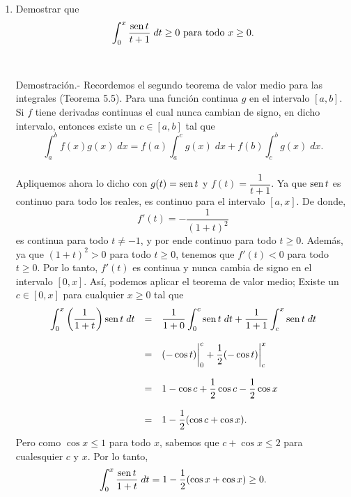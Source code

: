 \begin{enumerate}[\bfseries 1.]
    \item Demostrar que
    $$\int_0^x \dfrac{\mathop{\mbox{\normalfont sen}}\nolimits t}{t+1}\; dt \geq 0\mbox{ para todo }x\geq 0.$$\\\\
	Demostración.-\; Recordemos el segundo teorema de valor medio para las integrales (Teorema 5.5). Para una función continua $g$ en el intervalo $[a,b]$. Si $f$ tiene derivadas continuas el cual nunca cambian de signo, en dicho intervalo, entonces existe un $c\in[a,b]$ tal que
	$$\int_a^b f(x)g(x)\;dx =f(a)\int_a^c g(x)\; dx + f(b)\int_c^b g(x)\; dx.$$\\
	Apliquemos ahora lo dicho con $g(t)=\mathop{\mbox{\normalfont sen}}\nolimits t$ y $f(t)=\dfrac{1}{t+1}$. Ya que $\mathop{\mbox{\normalfont sen}}\nolimits t$ es continuo para todo los reales, es continuo para el intervalo $[a,x]$. De donde,
	$$f'(t)=-\dfrac{1}{(1+t)^2}$$
	es continua para todo $t\neq -1$, y por ende continuo para todo $t\geq 0$. Además, ya que $(1+t)^2>0$ para todo $t\geq 0$, tenemos que $f'(t)<0$ para todo $t\geq 0$. Por lo tanto, $f'(t)$ es continua y nunca cambia de signo en el intervalo $[0,x]$. Así, podemos aplicar el teorema de valor medio; Existe un $c\in[0,x]$ para cualquier $x\geq 0$ tal que
	$$
	\begin{array}{rcl}
	    \displaystyle\int_0^x \left(\dfrac{1}{1+t}\right)\mathop{\mbox{\normalfont sen}}\nolimits t\; dt &=& \dfrac{1}{1+0}\displaystyle\int_0^c \mathop{\mbox{\normalfont sen}}\nolimits t\; dt + \dfrac{1}{1+1}\int_c^x \mathop{\mbox{\normalfont sen}}\nolimits t\; dt\\\\
									 &=& (-\cos t)\bigg|_0^c+\dfrac{1}{2}(-\cos t)\bigg|_c^x\\\\
									 &=& 1-\cos c+\dfrac{1}{2}\cos c-\dfrac{1}{2}\cos x\\\\
									 &=&1-\dfrac{1}{2}(\cos c+\cos x).
	\end{array}
	$$
	Pero como $\cos x\leq 1$ para todo $x$, sabemos que $c+\cos x\leq 2$ para cualesquier $c$ y $x$. Por lo tanto,
	$$\int_0^x \dfrac{\mathop{\mbox{\normalfont sen}}\nolimits t}{1+t}\; dt = 1-\dfrac{1}{2}(\cos x+\cos x)\geq 0.$$\\



\end{enumerate}

